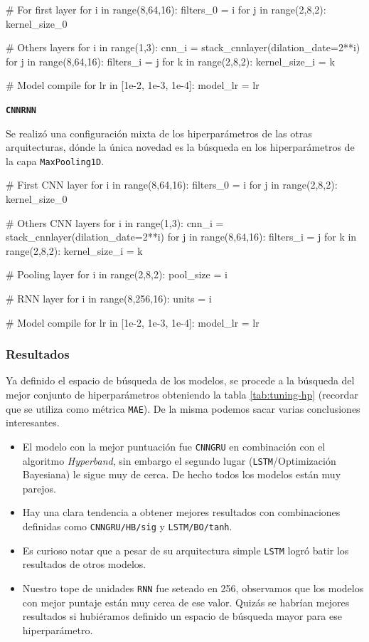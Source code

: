 \documentclass[a4paper,12pt]{article}
\begin{document}
\begin{python}
# For first layer
for i in range(8,64,16):
	filters_0 = i
	for j in range(2,8,2):
		kernel_size_0

# Others layers
for i in range(1,3):
	cnn_i = stack_cnnlayer(dilation_date=2**i)
	for j in range(8,64,16):
		filters_i = j
		for k in range(2,8,2):
			kernel_size_i = k

# Model compile
for lr in [1e-2, 1e-3, 1e-4]:
	model_lr = lr
\end{python}

\textbf{\texttt{CNNRNN}}

Se realizó una configuración mixta de los hiperparámetros de las otras arquitecturas, dónde la única novedad es la búsqueda en los hiperparámetros de la capa \texttt{MaxPooling1D}.

\begin{python}
# First CNN layer
for i in range(8,64,16):
	filters_0 = i
	for j in range(2,8,2):
		kernel_size_0

# Others CNN layers
for i in range(1,3):
	cnn_i = stack_cnnlayer(dilation_date=2**i)
	for j in range(8,64,16):
		filters_i = j
		for k in range(2,8,2):
			kernel_size_i = k
			
# Pooling layer
for i in range(2,8,2):
	pool_size = i
	
# RNN layer
for i in range(8,256,16):
	units = i
	
# Model compile
for lr in [1e-2, 1e-3, 1e-4]:
	model_lr = lr
\end{python}

\subsubsection{Resultados}

Ya definido el espacio de búsqueda de los modelos, se procede a la búsqueda del mejor conjunto de hiperparámetros obteniendo la tabla \ref{tab:tuning-hp} (recordar que se utiliza como métrica \texttt{MAE}). De la misma podemos sacar varias conclusiones interesantes.
\begin{itemize}
	\item El modelo con la mejor puntuación fue \texttt{CNNGRU} en combinación con el algoritmo \textit{Hyperband}, sin embargo el segundo lugar (\texttt{LSTM}/Optimización Bayesiana) le sigue muy de cerca. De hecho todos los modelos están muy parejos.
	\item Hay una clara tendencia a obtener mejores resultados con combinaciones definidas como \texttt{CNNGRU/HB/sig} y \texttt{LSTM/BO/tanh}.
	\item Es curioso notar que a pesar de su arquitectura simple \texttt{LSTM} logró batir los resultados de otros modelos.
	\item Nuestro tope de unidades \texttt{RNN} fue seteado en 256, observamos que los modelos con mejor puntaje están muy cerca de ese valor. Quizás se habrían mejores resultados si hubiéramos definido un espacio de búsqueda mayor para ese hiperparámetro.
\end{itemize}
\end{document}

